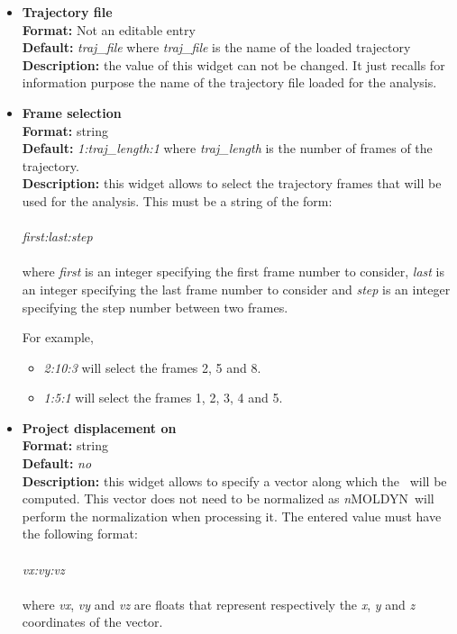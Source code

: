 \documentclass[a4paper,11pt]{report}
\newcommand{\NMOLDYN}{\textit{n}MOLDYN}
\begin{document}
\hypertarget{msd_trajectory_file}{}
\begin{itemize}
\item \textbf{Trajectory file}\\
\textbf{Format:} Not an editable entry\\
\textbf{Default:} \textit{traj\_file} where \textit{traj\_file} is the name of the loaded trajectory\\
\textbf{Description:} the value of this widget can not be changed. It just recalls for information purpose the name
of the trajectory file loaded for the analysis.

\hypertarget{msd_frame_selection}{}
\item \textbf{Frame selection}\\
\textbf{Format:} string\\
\textbf{Default:} \textit{1:traj\_length:1} where \textit{traj\_length} is the number of frames of the trajectory.\\
\textbf{Description:} this widget allows to select the trajectory frames that will be used for the analysis. This must
be a string of the form:
\\\\
\textit{first:last:step}
\\\\
where \textit{first} is an integer specifying the first frame number to consider, \textit{last} is an integer specifying the last 
frame number to consider and \textit{step} is an integer specifying the step number between two frames.

For example,
\begin{itemize}
\item \textit{2:10:3} will select the frames 2, 5 and 8.
\item \textit{1:5:1} will select the frames 1, 2, 3, 4 and 5.
\end{itemize}

\hypertarget{msd_project_displacement_on}{}
\item \textbf{Project displacement on}\\
\textbf{Format:} string\\
\textbf{Default:} \textit{no}\\
\textbf{Description:} this widget allows to specify a vector along which the \MSD\ will be computed. This vector does not 
need to be normalized as \NMOLDYN\ will perform the normalization when processing it. The entered value must have the 
following format:
\\\\
\textit{vx:vy:vz}
\\\\
where \textit{vx}, \textit{vy} and \textit{vz} are floats that represent respectively the \textit{x}, \textit{y} and \textit{z} coordinates of the vector.


\end{itemize}
\end{document}
